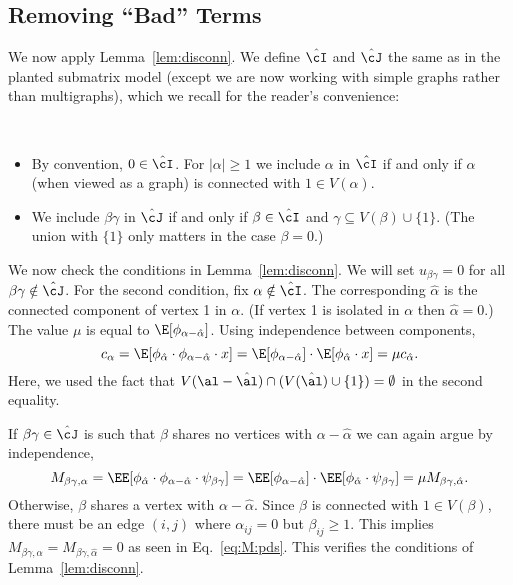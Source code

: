 \documentclass[11pt]{article}
\begin{document}
\subsection{Removing ``Bad'' Terms}
We now apply Lemma~\ref{lem:disconn}. We define $\hat\cI$ and $\hat\cJ$ the same as in the planted submatrix model (except we are now working with simple graphs rather than multigraphs), which we recall for the reader's convenience:
\begin{definition}
\,
\begin{itemize}
    \item By convention, $0 \in \hat\cI$. For $|\alpha| \ge 1$ we include $\alpha$ in $\hat\cI$ if and only if $\alpha$ (when viewed as a graph) is connected with $1 \in V(\alpha)$.
    \item We include $\beta\gamma$ in $\hat\cJ$ if and only if $\beta \in \hat\cI$ and $\gamma \subseteq V(\beta) \cup \{1\}$. (The union with $\{1\}$ only matters in the case $\beta = 0$.)
\end{itemize}
\end{definition}
\noindent We now check the conditions in Lemma~\ref{lem:disconn}. We will set $u_{\beta\gamma} = 0$ for all $\beta\gamma \notin \hat\cJ$. For the second condition, fix $\alpha \notin \hat\cI$. The corresponding $\hat\alpha$ is the connected component of vertex 1 in $\alpha$. (If vertex 1 is isolated in $\alpha$ then $\hat\alpha = 0$.) The value $\mu$ is equal to $\E[\phi_{\alpha - \hat\alpha}]$. Using independence between components,
\[ c_\alpha = \E[\phi_{\hat\alpha}\cdot \phi_{\alpha - \hat\alpha} \cdot x] = \E[\phi_{\alpha - \hat\alpha}] \cdot \E[\phi_{\hat\alpha}\cdot x] = \mu c_{\hat\alpha}. \]
Here, we used the fact that $V(\al-\hat\al)\cap (V(\hat\al)\cup\{1\})=\emptyset$ in the second equality.

If $\beta\gamma \in \hat\cJ$ is such that $\beta$ shares no vertices with $\alpha-\hat\alpha$ we can again argue by independence,
\[ M_{\beta\gamma,\alpha} = \EE[\phi_{\hat\alpha}\cdot \phi_{\alpha-\hat\alpha} \cdot \psi_{\beta\gamma}] = \EE[\phi_{\alpha-\hat\alpha}] \cdot \EE[\phi_{\hat\alpha} \cdot \psi_{\beta\gamma}] = \mu M_{\beta\gamma,\hat\alpha}. \]
Otherwise, $\beta$ shares a vertex with $\alpha-\hat\alpha$. Since $\beta$ is connected with $1 \in V(\beta)$, there must be an edge $(i,j)$ where $\alpha_{ij} = 0$ but $\beta_{ij} \ge 1$. This implies $M_{\beta\gamma,\alpha} = M_{\beta\gamma,\hat\alpha} = 0$ as seen in Eq.~\eqref{eq:M:pds}. This verifies the conditions of Lemma~\ref{lem:disconn}.
\end{document}

